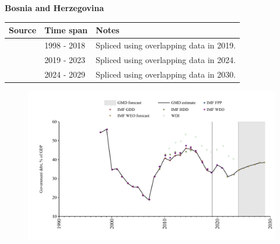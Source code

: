 \documentclass[12pt,a4paper,landscape]{article}
\begin{document}
\begin{adjustbox}{max totalsize={\paperwidth}{\paperheight},center}
\begin{minipage}[t][\textheight][t]{\textwidth}
\vspace*{0.5cm}
{}
\begin{center}
{\Large\bfseries Bosnia and Herzegovina}
\end{center}
\vspace{0.5cm}
\begin{table}[H]
\centering
\small
\begin{tabular}{|l|l|l|}
\hline
\textbf{Source} & \textbf{Time span} & \textbf{Notes} \\
\hline
\rowcolor{white}\cite{IMF_GDD}& 1998 - 2018 &Spliced using overlapping data in 2019.\\
\rowcolor{lightgray}\cite{IMF_FPP}& 2019 - 2023 &Spliced using overlapping data in 2024.\\
\rowcolor{white}\cite{IMF_WEO_forecast}& 2024 - 2029 &Spliced using overlapping data in 2030.\\
\hline
\end{tabular}
\end{table}
\begin{figure}[H]
\centering
\includegraphics[width=\textwidth,height=0.6\textheight,keepaspectratio]{graphs/BIH_govdebt_GDP.pdf}
\end{figure}
\end{minipage}
\end{adjustbox}
\end{document}
